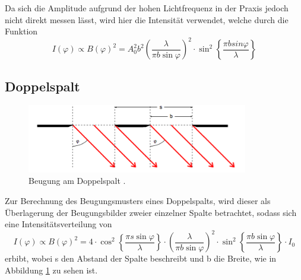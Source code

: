 Da sich die Amplitude aufgrund der hohen Lichtfrequenz in der Praxis jedoch nicht direkt messen lässt, wird hier
die Intensität verwendet, welche durch die Funktion
\begin{equation}
  I(\varphi) \propto B(\varphi)^2 = A_0^2b^2\left(\frac{\lambda}{\pi b \sin{\varphi}}\right)^2
  \cdot \sin^2\left\{{\frac{\pi b sin{\varphi}}{\lambda}}\right\}
  \label{eqn:int1}
\end{equation}
\subsection{Doppelspalt}
\begin{figure}[H]
  \centering
  \includegraphics[height=3cm]{Doppel.png}
  \caption{Beugung am Doppelspalt \cite{skript}.}
  \label{fig:doppel}
\end{figure}
Zur Berechnung des Beugungsmusters eines Doppelspalts, wird dieser als
Überlagerung der Beugungsbilder zweier einzelner Spalte betrachtet, sodass
sich eine Intensitätsverteilung von
\begin{equation}
  I(\varphi) \propto B(\varphi)^2 =4 \cdot \cos^2\left\{{\frac{\pi s \sin{\varphi}}{\lambda}}\right\}
  \cdot \left(\frac{\lambda}{\pi b \sin{\varphi}}\right)^2 \cdot \sin^2\left\{{\frac{\pi
  b \sin{\varphi}}{\lambda}}\right\} \cdot I_0
  \label{eqn:doppelinf}
\end{equation}
erbibt, wobei s den Abstand der Spalte beschreibt und b die Breite, wie in Abbildung
\ref{fig:doppel} zu sehen ist.
